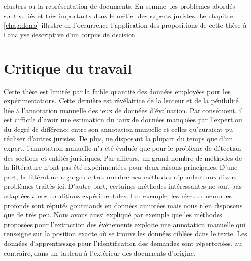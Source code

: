 clusters ou la représentation de documents. En somme, les problèmes abordés sont variés et très importants dans le métier des experts juristes. Le chapitre \ref{chap:demo} illustre en l'occurrence l'application des propositions de cette thèse à l'analyse descriptive d'un corpus de décision. 


\section{Critique du travail}
\label{sec:conclusion:critique}

Cette thèse est limitée par la faible quantité des données employées pour les expérimentations. Cette dernière est révélatrice de la lenteur et de la pénibilité liée à l'annotation manuelle des jeux de données d'évaluation. Par conséquent, il est difficile d'avoir une estimation du taux de données manquées par l'expert ou du degré de différence entre son annotation manuelle et celles qu'auraient pu réaliser d'autres juristes. De plus, ne disposant la plupart du temps que d'un expert, l'annotation manuelle n'a été évaluée que pour le problème de détection des sections et entités juridiques. Par ailleurs, un grand nombre de méthodes de la littérature n'ont pas été expérimentées pour deux raisons principales. D'une part, la littérature regorge de très nombreuses méthodes répondant aux divers problèmes traités ici. D'autre part, certaines méthodes intéressantes ne sont pas adaptées à nos conditions expérimentales. Par exemple, les réseaux neurones profonds sont réputés gourmands en données annotées mais nous n'en disposons que de très peu. Nous avons aussi expliqué par exemple que les méthodes proposées pour l'extraction des évènements exploite une annotation manuelle qui renseigne sur la position exacte où se trouve les données ciblées dans le texte. Les données d'apprentissage pour l'identification des demandes sont répertoriées, au contraire, dans un tableau à l'extérieur des documents d'origine.


